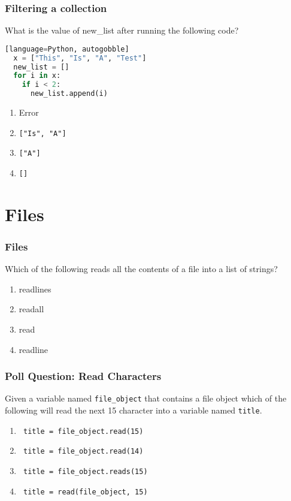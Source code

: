 \documentclass{beamer}
\begin{document}
%
%
\begin{frame}[fragile]
  \frametitle{Filtering a collection}
  What is the value of new\_list after running the following code?
  \begin{lstlisting}[language=Python, autogobble][language=Python, autogobble]
  x = ["This", "Is", "A", "Test"]
  new_list = []
  for i in x:
    if i < 2:
      new_list.append(i)
  \end{lstlisting}
  \vfill
  \begin{enumerate}[A]
    \item Error
    \item \lstinline|["Is", "A"]|
    \item \lstinline|["A"]|
    \item \lstinline|[]|
  \end{enumerate}
\end{frame}

\section{Files}

%
%
\begin{frame}[fragile]
  \frametitle{Files}
  Which of the following reads all the contents of a file into a list of strings?
  \vfill
  \begin{enumerate}[A]
    \item readlines
    \item readall
    \item read
    \item readline
  \end{enumerate}
\end{frame}


%
%
\begin{frame}[fragile]
  \frametitle{Poll Question: Read Characters}
  Given a variable named \lstinline|file_object| that contains a file object which of the following will read the next 15 character into a variable named \lstinline|title|.
  \vfill
  \begin{enumerate}[A]
    \item \lstinline| title = file_object.read(15)|
    \item \lstinline| title = file_object.read(14)|
    \item \lstinline| title = file_object.reads(15)|
    \item \lstinline| title = read(file_object, 15)|
  \end{enumerate}
\end{frame}
\end{document}
